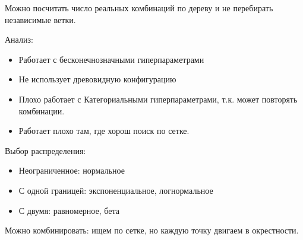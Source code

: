 Можно посчитать число реальных комбинаций по дереву и не перебирать
независимые ветки.


Анализ:
\begin{itemize}
    \item Работает с бесконечнозначными гиперпараметрами
    \item Не использует древовидную конфигурацию
    \item Плохо работает с Категориальными гиперпараметрами,
    т.к. может повторять комбинации.
    \item Работает плохо там, где хорош поиск по сетке.
\end{itemize}

Выбор распределения:
\begin{itemize}
    \item Неограниченное: нормальное
    \item С одной границей: экспоненциальное, логнормальное
    \item С двумя: равномерное, бета
\end{itemize}

Можно комбинировать: ищем по сетке, но каждую точку двигаем в
окрестности.

